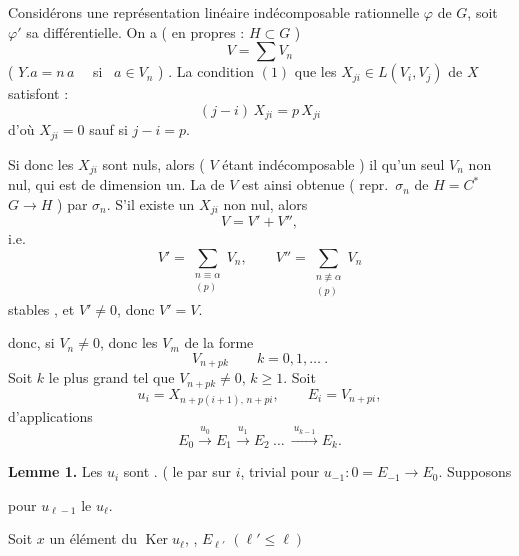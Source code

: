 \documentclass[11pt,a4paper]{article}
\begin{document}
Considérons une représentation linéaire indécomposable rationnelle $\varphi$ de
\struck{\ill{}} $G$, soit $\varphi'$ sa différentielle. On a
(  en  propres  : $H \subset G$ )
\[ V = \sum V_{n} \]
( $Y . a = n\, a$ \ \ si \ $a \in V_{n}$ )
. La condition $(1)$
 que les  $X_{ji} \in L(V_{i}, V_{j})$ de $X$
satisfont :
\[ (j - i)\, X_{ji} = p\, X_{ji} \]
d'où $X_{ji} = 0$ sauf si $j - i = p$.


Si donc les $X_{ji}$ sont nuls, alors ( $V$ étant indécomposable ) il \ill{}
qu'un seul $V_{n}$ non nul, qui est de dimension un. La \ill{} de $V$ est ainsi
obtenue ( \ill{} \ill{} repr.\ $\sigma_{n}$ de $H = C^{*}$ \ill{} \ill{}
$G \to H$ ) par $\sigma_{n}$. S'il existe un $X_{ji}$ non nul, alors
 \ill{}
\[ V = V' + V'' , \]
i.e.
\[ V' = \sum_{\substack{n \equiv \alpha \\ (p)}} V_{n} , \qquad
   V'' = \sum_{\substack{n \not\equiv \alpha \\ (p)}} V_{n} \]
\ill{} stables \ill{} \ill{}, et $V' \neq 0$, donc $V' = V$.

\ill{} \ill{} donc, si \struck{\ill{}}
  \ill{} $V_{n} \neq 0$, donc
les $V_{m}$ \ill{} \ill{} \ill{} \ill{} de la forme
\[ V_{n+pk} \qquad k = 0, 1, \ldots \ . \]
Soit $k$ le plus grand \ill{} tel que $V_{n+pk} \neq 0$, \struck{\ill{}} \ill{}
$k \geq 1$. Soit
\[ u_{i} = X_{n+p(i+1),\, n+pi} , \qquad E_{i} = V_{n+pi} , \]
\ill{} \ill{} \ill{} d'applications
\[ E_{0} \xrightarrow{\ u_{0}\ } E_{1} \xrightarrow{\ u_{1}\ } E_{2}
   \ \ldots \ \xrightarrow{\ u_{k-1}\ } E_{k} . \]

\textbf{Lemme 1.} Les $u_{i}$ sont \emph{}.
( \ill{} \ill{} le  par  sur $i$,
\ill{} trivial pour $u_{-1} : 0 = E_{-1} \to E_{0}$. Supposons


\ill{} \ill{} pour $u_{\ell-1}$ \struck{\ill{}} \ill{} le \ill{} $u_{\ell}$.

\struck{\ill{}} Soit $x$ un élément du $\operatorname{Ker} u_{\ell}$,
\struck{\ill{}}, \struck{\ill{} \ill{} \ill{} \ill{}} \add{\ill{}}
$E_{\ell'}$ $(\ell' \leq \ell)$
\end{document}
